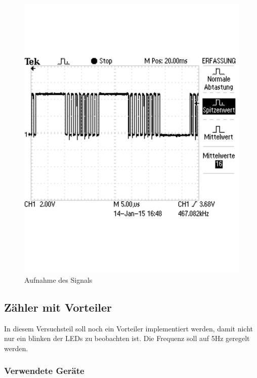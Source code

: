 \documentclass[12pt,a4paper]{article}
\begin{document}
\begin{figure}[H] 
  \centering 	
    \includegraphics[trim = 0mm 50mm 0mm 50mm, clip, scale = 0.4]{TEK0014.pdf}
  	\caption[Aufnahme des Signals]{Aufnahme des Signals} 
  \label{fig:o_1}
\end{figure}

\subsection{Zähler mit Vorteiler}

In diesem Versuchsteil soll noch ein Vorteiler implementiert werden, damit nicht nur ein blinken der LEDs zu beobachten ist. Die Frequenz soll auf 5Hz geregelt werden.

\subsubsection*{Verwendete Geräte}
\end{document}
